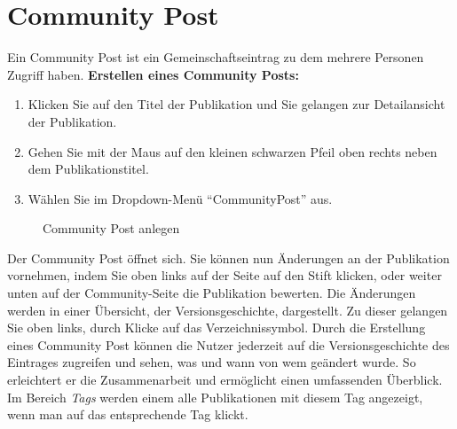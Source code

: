 \section{Community Post}
Ein Community Post ist ein Gemeinschaftseintrag zu dem mehrere Personen Zugriff haben. \newline \newline
\textbf{Erstellen eines Community Posts:}
\begin{enumerate}
	\item Klicken Sie auf den Titel der Publikation und Sie gelangen zur Detailansicht der Publikation. 
	\item Gehen Sie mit der Maus auf den kleinen schwarzen Pfeil oben rechts neben dem Publikationstitel. 
	\item Wählen Sie im Dropdown-Menü \enquote{CommunityPost} aus. \end{enumerate}
\begin{figure}[h!]
 \centering
 \caption{Community Post anlegen}
 \label{figure064}
\end{figure}
Der Community Post öffnet sich. Sie können nun Änderungen an der Publikation vornehmen, indem Sie oben links auf der Seite auf den Stift klicken, oder weiter unten auf der Community-Seite die Publikation bewerten. Die Änderungen werden in einer Übersicht, der Versionsgeschichte, dargestellt. Zu dieser gelangen Sie oben links, durch Klicke auf das Verzeichnissymbol.\newline
Durch die Erstellung eines Community Post können die Nutzer jederzeit auf die Versionsgeschichte des Eintrages zugreifen und sehen, was und wann von wem geändert wurde. So erleichtert er die Zusammenarbeit und ermöglicht einen umfassenden Überblick. \newline
Im Bereich \textit{Tags} werden einem alle Publikationen mit diesem Tag angezeigt, wenn man auf das entsprechende Tag klickt. \newline
